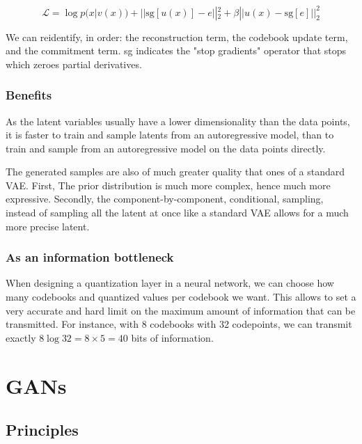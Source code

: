 \begin{equation}
    \mathcal{L} = \log p(x|v(x)) + ||\text{sg}[u(x)] − e||_2^2 + \beta ||u(x) − \text{sg}[e]||_2^2
\end{equation}

We can reidentify, in order: the reconstruction term, the codebook update term, and the commitment term. sg indicates the "stop gradients" operator that stops which zeroes partial derivatives.

\subsubsection{Benefits}

As the latent variables usually have a lower dimensionality than the data points, it is faster to train and sample latents from an autoregressive model, than to train and sample from an autoregressive model on the data points directly.

The generated samples are also of much greater quality that ones of a standard VAE. First, The prior distribution is much more complex, hence much more expressive. Secondly, the component-by-component, conditional, sampling, instead of sampling all the latent at once like a standard VAE allows for a much more precise latent.

\subsubsection{As an information bottleneck}

When designing a quantization layer in a neural network, we can choose how many codebooks and quantized values per codebook we want. This allows to set a very accurate and hard limit on the maximum amount of information that can be transmitted. For instance, with 8 codebooks with 32 codepoints, we can transmit exactly $8 \log 32 = 8 \times 5 = 40$ bits of information.

\section{\acfp{GAN}}
\label{sec:gan}
\subsection{Principles}

